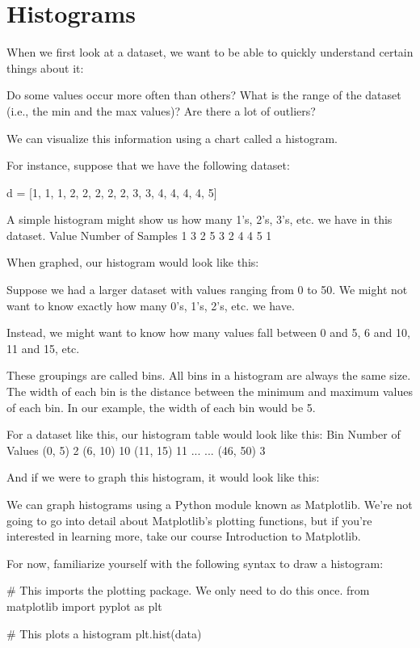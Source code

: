 \documentclass{journal}
\begin{document}
\section{Histograms}

When we first look at a dataset, we want to be able to quickly understand certain things about it:

    Do some values occur more often than others?
    What is the range of the dataset (i.e., the min and the max values)?
    Are there a lot of outliers?

We can visualize this information using a chart called a histogram.

For instance, suppose that we have the following dataset:

d = [1, 1, 1, 2, 2, 2, 2, 2, 3, 3, 4, 4, 4, 4, 5]

A simple histogram might show us how many 1's, 2's, 3's, etc. we have in this dataset.
Value 	Number of Samples
1 	3
2 	5
3 	2
4 	4
5 	1

When graphed, our histogram would look like this:


Suppose we had a larger dataset with values ranging from 0 to 50. We might not want to know exactly how many 0's, 1's, 2's, etc. we have.

Instead, we might want to know how many values fall between 0 and 5, 6 and 10, 11 and 15, etc.

These groupings are called bins. All bins in a histogram are always the same size. The width of each bin is the distance between the minimum and maximum values of each bin. In our example, the width of each bin would be 5.

For a dataset like this, our histogram table would look like this:
Bin 	Number of Values
(0, 5) 	2
(6, 10) 	10
(11, 15) 	11
... 	...
(46, 50) 	3

And if we were to graph this histogram, it would look like this: 


We can graph histograms using a Python module known as Matplotlib. We're not going to go into detail about Matplotlib’s plotting functions, but if you're interested in learning more, take our course Introduction to Matplotlib.

For now, familiarize yourself with the following syntax to draw a histogram:

# This imports the plotting package.  We only need to do this once.
from matplotlib import pyplot as plt 

# This plots a histogram
plt.hist(data)
\end{document}
